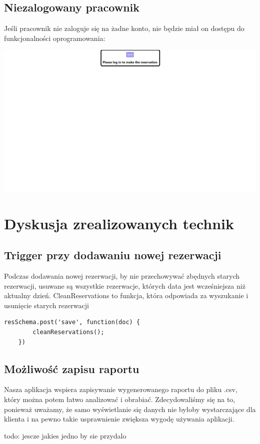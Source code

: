 \documentclass[12pt]{article}
\begin{document}
\newpage
\subsection{Niezalogowany pracownik}
\begin{minipage}{\textwidth}
\noindent Jeśli pracownik nie zaloguje się na żadne konto, nie będzie miał on dostępu do funkcjonalności oprogramowania:
\begin{center}
\includegraphics[width=\textwidth]{media/NotLoggenIn.png}
\end{center}
\end{minipage}

\newpage
\section{Dyskusja zrealizowanych technik}

\subsection{Trigger przy dodawaniu nowej rezerwacji}
Podczas dodawania nowej rezerwacji, by nie przechowywać zbędnych starych rezerwacji, usuwane są wszystkie rezerwacje, których data jest wcześniejsza niż aktualny dzień. CleanReservations to funkcja, która odpowiada za wyszukanie i usunięcie starych rezerwacji
\begin{lstlisting}[caption={Trigger}]
	resSchema.post('save', function(doc) {
		cleanReservations();
	})
\end{lstlisting}

\subsection{Możliwość zapisu raportu}
Nasza aplikacja wspiera zapisywanie wygenerowanego raportu do pliku .csv, który można potem łatwo analizować i obrabiać. Zdecydowaliśmy się na to, ponieważ uważamy, że samo wyświetlanie się danych nie byłoby wystarczające dla klienta i na pewno takie usprawnienie zwiększa wygodę używania aplikacji.

todo: jescze jakies jedno by sie przydalo
\end{document}

